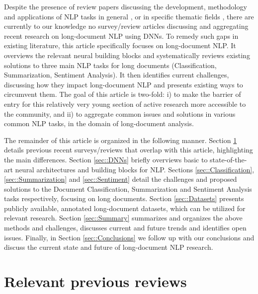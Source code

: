 \documentclass[preprint,review,12pt]{elsarticle}
\begin{document}
Despite the presence of review papers discussing the development, methodology and applications of NLP tasks in general \cite{kowasari} \cite{torfi} \cite{chai}, or in specific thematic fields \cite{nielker} \cite{qian} \cite{gupta} \cite{hussein}, there are currently to our knowledge no survey/review articles discussing and aggregating recent research on long-document NLP using DNNs. To remedy such gaps in existing literature, this article specifically focuses on long-document NLP. It overviews the relevant neural building blocks and systematically reviews existing solutions to three main NLP tasks for long documents (Classification, Summarization, Sentiment Analysis). It then identifies current challenges, discussing how they impact long-document NLP and presents existing ways to circumvent them. The goal of this article is two-fold: i) to make the barrier of entry for this relatively very young section of active research more accessible to the community, and ii) to aggregate common issues and solutions in various common NLP tasks, in the domain of long-document analysis.

The remainder of this article is organized in the following manner. Section \ref{sec::existingReviews} details previous recent surveys/reviews that overlap with this article, highlighting the main differences. Section \ref{sec::DNNs} briefly overviews basic to state-of-the-art neural architectures and building blocks for NLP. Sections \ref{sec::Classification}, \ref{sec::Summarization} and \ref{sec::Sentiment} detail the challenges and proposed solutions to the Document Classification, Summarization and Sentiment Analysis tasks respectively, focusing on long documents. Section \ref{sec::Datasets} presents publicly available, annotated long-document datasets, which can be utilized for relevant research. Section \ref{sec::Summary} summarizes and organizes the above methods and challenges, discusses current and future trends and identifies open issues. Finally, in Section \ref{sec::Conclusions} we follow up with our conclusions and discuss the current state and future of long-document NLP research.
    
\section{Relevant previous reviews}
\label{sec::existingReviews}
\end{document}

